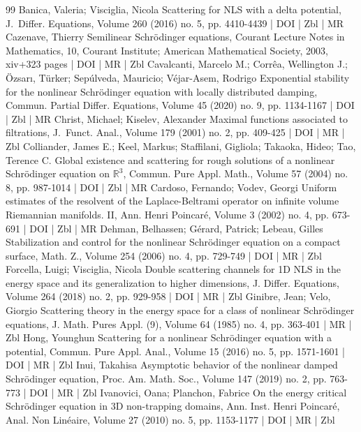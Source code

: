 \begin{thebibliography}{99}
Banica, Valeria; Visciglia, Nicola Scattering for NLS with a delta potential, J. Differ. Equations, Volume 260 (2016) no. 5, pp. 4410-4439 | DOI | Zbl | MR
Cazenave, Thierry Semilinear Schrödinger equations, Courant Lecture Notes in Mathematics, 10, Courant Institute; American Mathematical Society, 2003, xiv+323 pages | DOI | MR | Zbl
Cavalcanti, Marcelo M.; Corrêa, Wellington J.; Özsarı, Türker; Sepúlveda, Mauricio; Véjar-Asem, Rodrigo Exponential stability for the nonlinear Schrödinger equation with locally distributed damping, Commun. Partial Differ. Equations, Volume 45 (2020) no. 9, pp. 1134-1167 | DOI | Zbl | MR
Christ, Michael; Kiselev, Alexander Maximal functions associated to filtrations, J. Funct. Anal., Volume 179 (2001) no. 2, pp. 409-425 | DOI | MR | Zbl
Colliander, James E.; Keel, Markus; Staffilani, Gigliola; Takaoka, Hideo; Tao, Terence C. Global existence and scattering for rough solutions of a nonlinear Schrödinger equation on $\mathbb{R}^3$, Commun. Pure Appl. Math., Volume 57 (2004) no. 8, pp. 987-1014 | DOI | Zbl | MR
Cardoso, Fernando; Vodev, Georgi Uniform estimates of the resolvent of the Laplace-Beltrami operator on infinite volume Riemannian manifolds. II, Ann. Henri Poincaré, Volume 3 (2002) no. 4, pp. 673-691 | DOI | Zbl | MR
Dehman, Belhassen; Gérard, Patrick; Lebeau, Gilles Stabilization and control for the nonlinear Schrödinger equation on a compact surface, Math. Z., Volume 254 (2006) no. 4, pp. 729-749 | DOI | MR | Zbl
Forcella, Luigi; Visciglia, Nicola Double scattering channels for 1D NLS in the energy space and its generalization to higher dimensions, J. Differ. Equations, Volume 264 (2018) no. 2, pp. 929-958 | DOI | MR | Zbl
Ginibre, Jean; Velo, Giorgio Scattering theory in the energy space for a class of nonlinear Schrödinger equations, J. Math. Pures Appl. (9), Volume 64 (1985) no. 4, pp. 363-401 | MR | Zbl
Hong, Younghun Scattering for a nonlinear Schrödinger equation with a potential, Commun. Pure Appl. Anal., Volume 15 (2016) no. 5, pp. 1571-1601 | DOI | MR | Zbl
Inui, Takahisa Asymptotic behavior of the nonlinear damped Schrödinger equation, Proc. Am. Math. Soc., Volume 147 (2019) no. 2, pp. 763-773 | DOI | MR | Zbl
Ivanovici, Oana; Planchon, Fabrice On the energy critical Schrödinger equation in $3\mathrm{D}$ non-trapping domains, Ann. Inst. Henri Poincaré, Anal. Non Linéaire, Volume 27 (2010) no. 5, pp. 1153-1177 | DOI | MR | Zbl

\end{thebibliography}
